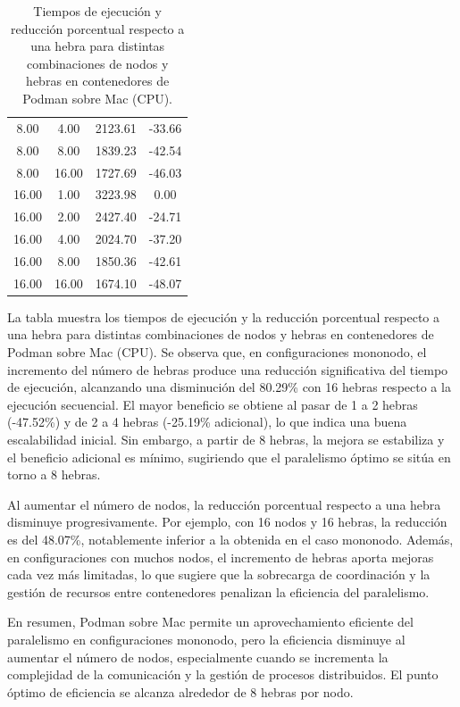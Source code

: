 \begin{table}[ht]
\begin{tabular}{|c|c|c|c|}
        8.00           & 4.00            & 2123.61             & -33.66                         \\
        8.00           & 8.00            & 1839.23             & -42.54                         \\
        8.00           & 16.00           & 1727.69             & -46.03                         \\
        16.00          & 1.00            & 3223.98             & 0.00                           \\
        16.00          & 2.00            & 2427.40             & -24.71                         \\
        16.00          & 4.00            & 2024.70             & -37.20                         \\
        16.00          & 8.00            & 1850.36             & -42.61                         \\
        16.00          & 16.00           & 1674.10             & -48.07                         \\
        \hline
    \end{tabular}
    \caption{Tiempos de ejecución y reducción porcentual respecto a una hebra para distintas combinaciones de nodos y hebras en contenedores de Podman sobre Mac (CPU).}
    \label{tab:thread_sweep_mac_podman_time}
\end{table}

La tabla muestra los tiempos de ejecución y la reducción porcentual respecto a una hebra para distintas combinaciones de nodos y hebras en contenedores de Podman sobre Mac (CPU). Se observa que, en configuraciones mononodo, el incremento del número de hebras produce una reducción significativa del tiempo de ejecución, alcanzando una disminución del 80.29\% con 16 hebras respecto a la ejecución secuencial. El mayor beneficio se obtiene al pasar de 1 a 2 hebras (-47.52\%) y de 2 a 4 hebras (-25.19\% adicional), lo que indica una buena escalabilidad inicial. Sin embargo, a partir de 8 hebras, la mejora se estabiliza y el beneficio adicional es mínimo, sugiriendo que el paralelismo óptimo se sitúa en torno a 8 hebras.

Al aumentar el número de nodos, la reducción porcentual respecto a una hebra disminuye progresivamente. Por ejemplo, con 16 nodos y 16 hebras, la reducción es del 48.07\%, notablemente inferior a la obtenida en el caso mononodo. Además, en configuraciones con muchos nodos, el incremento de hebras aporta mejoras cada vez más limitadas, lo que sugiere que la sobrecarga de coordinación y la gestión de recursos entre contenedores penalizan la eficiencia del paralelismo.

En resumen, Podman sobre Mac permite un aprovechamiento eficiente del paralelismo en configuraciones mononodo, pero la eficiencia disminuye al aumentar el número de nodos, especialmente cuando se incrementa la complejidad de la comunicación y la gestión de procesos distribuidos. El punto óptimo de eficiencia se alcanza alrededor de 8 hebras por nodo.